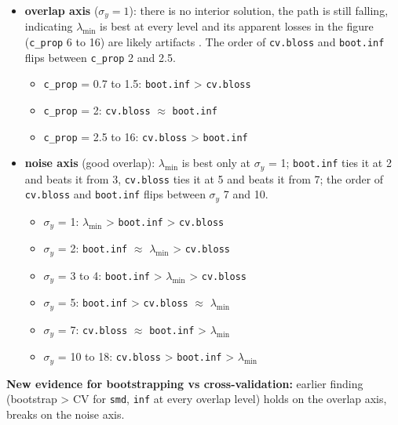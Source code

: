\documentclass[
  letterpaper,
  DIV=11,
  numbers=noendperiod]{scrartcl}
\providecommand{\tightlist}{%
  \setlength{\itemsep}{0pt}\setlength{\parskip}{0pt}}
\begin{document}
\begin{itemize}
\item
  \textbf{overlap axis} (\(\sigma_y = 1\)): there is no interior
  solution, the path is still falling, indicating \(\lambda_{\min}\) is
  best at every level and its apparent losses in the figure
  (\texttt{c\_prop} 6 to 16) are likely artifacts . The order of
  \texttt{cv.bloss} and \texttt{boot.inf} flips between \texttt{c\_prop}
  2 and 2.5.

  \begin{itemize}
  \tightlist
  \item
    \texttt{c\_prop} = 0.7 to 1.5: \texttt{boot.inf} \textgreater{}
    \texttt{cv.bloss}
  \item
    \texttt{c\_prop} = 2: \texttt{cv.bloss} \(\approx\)
    \texttt{boot.inf}
  \item
    \texttt{c\_prop} = 2.5 to 16: \texttt{cv.bloss} \textgreater{}
    \texttt{boot.inf}
  \end{itemize}
\item
  \textbf{noise axis} (good overlap): \(\lambda_{\min}\) is best only at
  \(\sigma_y\) = 1; \texttt{boot.inf} ties it at 2 and beats it from 3,
  \texttt{cv.bloss} ties it at 5 and beats it from 7; the order of
  \texttt{cv.bloss} and \texttt{boot.inf} flips between \(\sigma_y\) 7
  and 10.

  \begin{itemize}
  \item
    \(\sigma_y\) = 1: \(\lambda_{\min}\) \textgreater{}
    \texttt{boot.inf} \textgreater{} \texttt{cv.bloss}
  \item
    \(\sigma_y\) = 2: \texttt{boot.inf} \(\approx\) \(\lambda_{\min}\)
    \textgreater{} \texttt{cv.bloss}
  \item
    \(\sigma_y\) = 3 to 4: \texttt{boot.inf} \textgreater{}
    \(\lambda_{\min}\) \textgreater{} \texttt{cv.bloss}
  \item
    \(\sigma_y\) = 5: \texttt{boot.inf} \textgreater{} \texttt{cv.bloss}
    \(\approx\) \(\lambda_{\min}\)
  \item
    \(\sigma_y\) = 7: \texttt{cv.bloss} \(\approx\) \texttt{boot.inf}
    \textgreater{} \(\lambda_{\min}\)
  \item
    \(\sigma_y\) = 10 to 18: \texttt{cv.bloss} \textgreater{}
    \texttt{boot.inf} \textgreater{} \(\lambda_{\min}\)
  \end{itemize}
\end{itemize}

\textbf{New evidence for bootstrapping vs cross-validation:} earlier
finding (bootstrap \textgreater{} CV for \texttt{smd}, \texttt{inf} at
every overlap level) holds on the overlap axis, breaks on the noise
axis.
\end{document}
